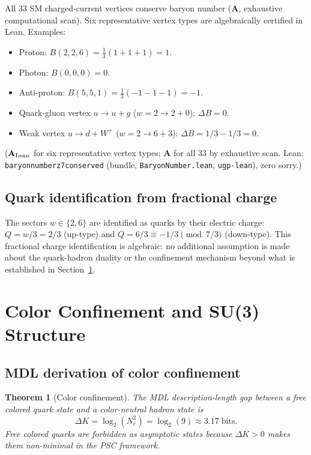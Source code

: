 \documentclass[11pt]{article}
\newtheorem{theorem}{Theorem}[section]
\theoremstyle{remark}
\newcommand{\lean}[1]{%
  \penalty-100
  \begingroup\def\_{\textunderscore\allowbreak}\texttt{#1}\endgroup}
\newcommand{\CatA}{\textbf{A}}
\newcommand{\CatAL}{\ensuremath{\textbf{A}_{\rm Lean}}}
\begin{document}
All 33 SM charged-current vertices conserve baryon number ($\CatA$, exhaustive
computational scan). Six representative vertex types are algebraically certified in Lean.
Examples:
\begin{itemize}[itemsep=2pt]
\item Proton: $B(2,2,6) = \tfrac{1}{3}(1+1+1) = 1$. \checkmark
\item Photon: $B(0,0,0) = 0$. \checkmark
\item Anti-proton: $B(5,5,1) = \tfrac{1}{3}(-1-1-1) = -1$. \checkmark
\item Quark-gluon vertex $u\to u+g$ ($w=2\to 2+0$): $\Delta B = 0$. \checkmark
\item Weak vertex $u\to d+W^+$ ($w=2\to 6+3$): $\Delta B = 1/3 - 1/3 = 0$. \checkmark
\end{itemize}
($\CatAL$ for six representative vertex types; $\CatA$ for all 33 by exhaustive scan.
Lean: \lean{baryon\_number\_z7\_conserved} (bundle, \texttt{BaryonNumber.lean},
\texttt{ugp-lean}), zero sorry.)

\subsection{Quark identification from fractional charge}
\label{ssec:quark_id}

The sectors $w\in\{2,6\}$ are identified as quarks by their electric charge:
$Q = w/3 = 2/3$ (up-type) and $Q = 6/3 \equiv -1/3 \pmod{7/3}$ (down-type).
This fractional charge identification is algebraic: no additional assumption is
made about the quark-hadron duality or the confinement mechanism beyond what
is established in Section~\ref{sec:color}.

\section{Color Confinement and SU(3) Structure}
\label{sec:color}

\subsection{MDL derivation of color confinement}
\label{ssec:confinement}

\begin{theorem}[Color confinement]
\label{thm:confinement}
The MDL description-length gap between a free colored quark state and a
color-neutral hadron state is
\[
  \Delta K = \log_2(N_c^2) = \log_2(9) \approx 3.17\;\text{bits}.
\]
Free colored quarks are forbidden as asymptotic states because $\Delta K > 0$
makes them non-minimal in the PSC framework.
\end{theorem}
\end{document}

